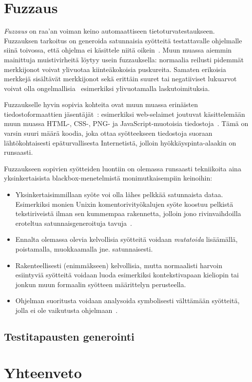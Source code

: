 \section{Fuzzaus}

\emph{Fuzzaus} on raa'an voiman keino automaattiseen tietoturvatestaukseen.
Fuzzauksen tarkoitus on generoida satunnaisia syötteitä testattavalle ohjelmalle siinä toivossa,
että ohjelma ei käsittele niitä oikein~\cite{UnixReliability}.
Muun muassa aiemmin mainittuja muistivirheitä löytyy usein fuzzauksella:
normaalia reilusti pidemmät merkkijonot voivat ylivuotaa kiinteäkokoisia puskureita.
Samaten erikoisia merkkejä sisältävät merkkijonot sekä erittäin suuret tai negatiiviset lukuarvot
voivat olla ongelmallisia~\cite{ViolatingAssumptions}
esimerkiksi ylivuotamalla laskutoimituksia.

Fuzzaukselle hyvin sopivia kohteita ovat muun muassa erinäisten tiedostoformaattien jäsentäjät~\cite{SageArtikkeli,OuluBrowser}:
esimerkiksi web-selaimet joutuvat käsittelemään muun muassa
HTML-, CSS-, PNG- ja JavaScript-muotoisia tiedostoja~\cite{OuluBrowser}.
Tämä on varsin suuri määrä koodia,
joka ottaa syötteekseen tiedostoja suoraan lähtökohtaisesti epäturvallisesta Internetistä,
jolloin hyökkäyspinta-alaakin on runsaasti.

Fuzzaukseen sopivien syötteiden luontiin on olemassa runsaasti tekniikoita aina yksinkertaisista blackbox-menetelmistä monimutkaisempiin keinoihin:
\begin{itemize}
    \item Yksinkertaisimmillaan syöte voi olla lähes pelkkää satunnaista dataa.
          Esimerkiksi monien Unixin komentorivityökalujen syöte koostuu pelkistä tekstiriveistä ilman sen kummempaa rakennetta,
          jolloin jono rivinvaihdoilla eroteltua satunnaisgeneroituja tavuja~\cite{UnixReliability}.
    \item Ennalta olemassa olevia kelvollisia syötteitä voidaan \emph{mutatoida} lisäämällä, poistamalla, muokkaamalla jne. satunnaisesti.
    \item Rakenteellisesti (enimmäkseen) kelvollisia, mutta normaalisti harvoin esiintyviä syötteitä voidaan luoda esimerkiksi kontekstivapaan kieliopin tai jonkun muun formaalin syötteen määrittelyn perusteella.
    \item Ohjelman suoritusta voidaan analysoida symbolisesti välttämään syötteitä, jolla ei ole vaikutusta ohjelmaan~\cite{SageArtikkeli}.
\end{itemize}

\subsection{Testitapausten generointi}

\section{Yhteenveto}
